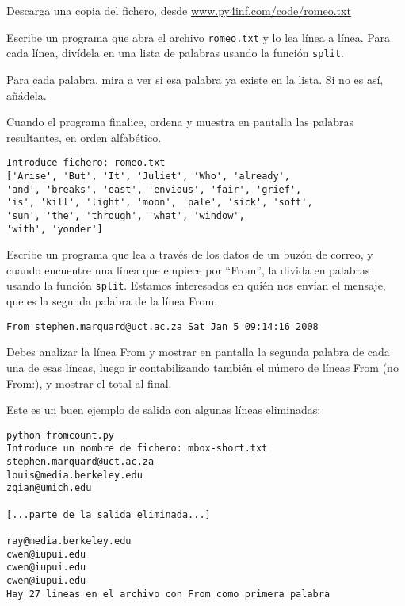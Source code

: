 \begin{ex}
Descarga una copia del fichero, desde
\url{www.py4inf.com/code/romeo.txt}

Escribe un programa que abra el archivo {\tt romeo.txt} y lo lea
línea a línea. Para cada línea, divídela en una lista de
palabras usando la función {\tt split}.

Para cada palabra, mira a ver si esa palabra ya existe en la lista.
Si no es así, añádela.

Cuando el programa finalice, ordena y muestra en pantalla las
palabras resultantes, en orden alfabético.

\begin{verbatim}
Introduce fichero: romeo.txt
['Arise', 'But', 'It', 'Juliet', 'Who', 'already', 
'and', 'breaks', 'east', 'envious', 'fair', 'grief', 
'is', 'kill', 'light', 'moon', 'pale', 'sick', 'soft', 
'sun', 'the', 'through', 'what', 'window', 
'with', 'yonder']
\end{verbatim}
\end{ex}

\begin{ex}
Escribe un programa que lea a través de los datos de un buzón de correo, y cuando
encuentre una línea que empiece por ``From'', la divida en
palabras usando la función {\tt split}. Estamos interesados en
quién nos envían el mensaje, que es la segunda palabra de la línea From.

{\tt From stephen.marquard@uct.ac.za Sat Jan  5 09:14:16 2008 }

Debes analizar la línea From y mostrar en pantalla la segunda palabra de
cada una de esas líneas, luego ir contabilizando también el número de líneas From
(no From:), y mostrar el total al final.

Este es un buen ejemplo de salida con algunas líneas eliminadas:

\beforeverb
\begin{verbatim}
python fromcount.py 
Introduce un nombre de fichero: mbox-short.txt
stephen.marquard@uct.ac.za
louis@media.berkeley.edu
zqian@umich.edu

[...parte de la salida eliminada...]

ray@media.berkeley.edu
cwen@iupui.edu
cwen@iupui.edu
cwen@iupui.edu
Hay 27 lineas en el archivo con From como primera palabra
\end{verbatim}
\afterverb
%
\end{ex}

